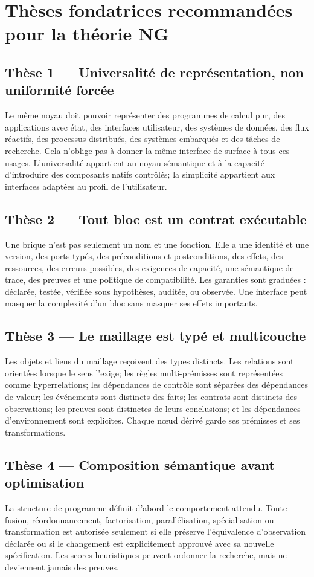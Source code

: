 \documentclass[11pt,a4paper]{article}
\begin{document}
\section{Thèses fondatrices recommandées pour la théorie NG}
\subsection{Thèse 1 — Universalité de représentation, non uniformité forcée}
Le même noyau doit pouvoir représenter des programmes de calcul pur, des applications avec état, des interfaces utilisateur, des systèmes de données, des flux réactifs, des processus distribués, des systèmes embarqués et des tâches de recherche. Cela n'oblige pas à donner la même interface de surface à tous ces usages. L'universalité appartient au noyau sémantique et à la capacité d'introduire des composants natifs contrôlés; la simplicité appartient aux interfaces adaptées au profil de l'utilisateur.

\subsection{Thèse 2 — Tout bloc est un contrat exécutable}
Une brique n'est pas seulement un nom et une fonction. Elle a une identité et une version, des ports typés, des préconditions et postconditions, des effets, des ressources, des erreurs possibles, des exigences de capacité, une sémantique de trace, des preuves et une politique de compatibilité. Les garanties sont graduées : déclarée, testée, vérifiée sous hypothèses, auditée, ou observée. Une interface peut masquer la complexité d'un bloc sans masquer ses effets importants.

\subsection{Thèse 3 — Le maillage est typé et multicouche}
Les objets et liens du maillage reçoivent des types distincts. Les relations sont orientées lorsque le sens l'exige; les règles multi-prémisses sont représentées comme hyperrelations; les dépendances de contrôle sont séparées des dépendances de valeur; les événements sont distincts des faits; les contrats sont distincts des observations; les preuves sont distinctes de leurs conclusions; et les dépendances d'environnement sont explicites. Chaque nœud dérivé garde ses prémisses et ses transformations.

\subsection{Thèse 4 — Composition sémantique avant optimisation}
La structure de programme définit d'abord le comportement attendu. Toute fusion, réordonnancement, factorisation, parallélisation, spécialisation ou transformation est autorisée seulement si elle préserve l'équivalence d'observation déclarée ou si le changement est explicitement approuvé avec sa nouvelle spécification. Les scores heuristiques peuvent ordonner la recherche, mais ne deviennent jamais des preuves.
\end{document}
